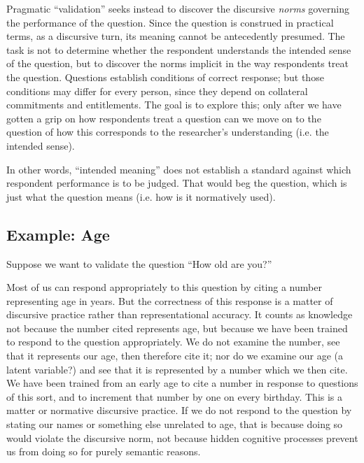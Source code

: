 \documentclass[11pt,twoside]{article}
\begin{document}
Pragmatic \enquote{validation} seeks instead to discover the
discursive \textit{norms} governing the performance of the question.
Since the question is construed in practical terms, as a discursive
turn, its meaning cannot be antecedently presumed.  The task is not to
determine whether the respondent understands the intended sense of the
question, but to discover the norms implicit in the way respondents
treat the question.  Questions establish conditions of correct
response; but those conditions may differ for every person, since they
depend on collateral commitments and entitlements.  The goal is to
explore this; only after we have gotten a grip on how respondents
treat a question can we move on to the question of how this
corresponds to the researcher's understanding (i.e. the intended
sense).

In other words, \enquote{intended meaning} does not establish a
standard against which respondent performance is to be judged.  That
would beg the question, which is just what the question means
(i.e. how is it normatively used).

\subsection{Example:  Age}

Suppose we want to validate the question ``How old are you?''

Most of us can respond appropriately to this question by citing a
number representing age in years.  But the correctness of this
response is a matter of discursive practice rather than
representational accuracy.  It counts as knowledge not because the
number cited represents age, but because we have been trained to
respond to the question appropriately.  We do not examine the number,
see that it represents our age, then therefore cite it; nor do we
examine our age (a latent variable?) and see that it is represented by
a number which we then cite.  We have been trained from an early age
to cite a number in response to questions of this sort, and to
increment that number by one on every birthday.  This is a matter or
normative discursive practice.  If we do not respond to the question
by stating our names or something else unrelated to age, that is
because doing so would violate the discursive norm, not because hidden
cognitive processes prevent us from doing so for purely semantic
reasons.
\end{document}
